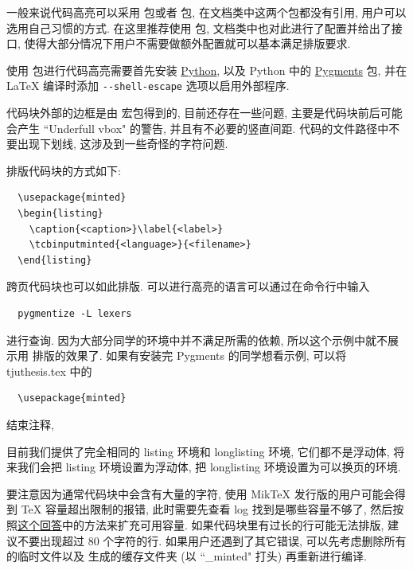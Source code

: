 一般来说代码高亮可以采用  包或者  包, 在文档类中这两个包都没有引用, 用户可以选用自己习惯的方式. 在这里推荐使用  包, 文档类中也对此进行了配置并给出了接口, 使得大部分情况下用户不需要做额外配置就可以基本满足排版要求.

使用  包进行代码高亮需要首先安装 \href{https://wiki.python.org/moin/BeginnersGuide/Download}{Python}, 以及 Python 中的 \href{https://pygments.org/download/}{Pygments} 包, 并在 {\LaTeX} 编译时添加 \verb|--shell-escape| 选项以启用外部程序.

代码块外部的边框是由  宏包得到的, 目前还存在一些问题, 主要是代码块前后可能会产生 ``Underfull vbox" 的警告, 并且有不必要的竖直间距. 代码的文件路径中不要出现下划线, 这涉及到一些奇怪的字符问题.

排版代码块的方式如下:
\begin{verbatim}
  \usepackage{minted}
  \begin{listing}
    \caption{<caption>}\label{<label>}
    \tcbinputminted{<language>}{<filename>}
  \end{listing}
\end{verbatim}
跨页代码块也可以如此排版. 可以进行高亮的语言可以通过在命令行中输入
\begin{verbatim}
  pygmentize -L lexers
\end{verbatim}
进行查询. 因为大部分同学的环境中并不满足所需的依赖, 所以这个示例中就不展示用  排版的效果了. 如果有安装完 Pygments 的同学想看示例, 可以将 tjuthesis.tex 中的
\begin{verbatim}
  \usepackage{minted}
\end{verbatim}
结束注释,

目前我们提供了完全相同的 listing 环境和 longlisting 环境, 它们都不是浮动体, 将来我们会把 listing 环境设置为浮动体, 把 longlisting 环境设置为可以换页的环境.

要注意因为通常代码块中会含有大量的字符, 使用 MikTeX 发行版的用户可能会得到 TeX 容量超出限制的报错, 此时需要先查看 log 找到是哪些容量不够了, 然后按照\href{https://tex.stackexchange.com/a/548335/}{这个回答}中的方法来扩充可用容量. 如果代码块里有过长的行可能无法排版, 建议不要出现超过 80 个字符的行. 如果用户还遇到了其它错误, 可以先考虑删除所有的临时文件以及  生成的缓存文件夹 (以 ``\_minted" 打头) 再重新进行编译.


